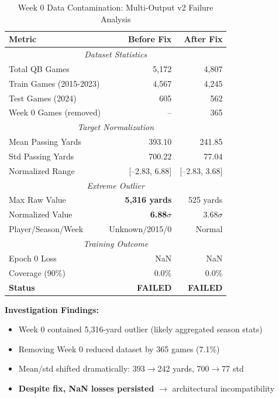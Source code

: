\begin{table}[htbp]
\centering
\caption{Week 0 Data Contamination: Multi-Output v2 Failure Analysis}
\label{tab:week_0_contamination}
\begin{tabular}{lrr}
\toprule
\textbf{Metric} & \textbf{Before Fix} & \textbf{After Fix} \\
\midrule
\multicolumn{3}{c}{\textit{Dataset Statistics}} \\
\midrule
Total QB Games & 5,172 & 4,807 \\
Train Games (2015-2023) & 4,567 & 4,245 \\
Test Games (2024) & 605 & 562 \\
Week 0 Games (removed) & -- & 365 \\
\midrule
\multicolumn{3}{c}{\textit{Target Normalization}} \\
\midrule
Mean Passing Yards & 393.10 & 241.85 \\
Std Passing Yards & 700.22 & 77.04 \\
Normalized Range & [--2.83, 6.88] & [--2.83, 3.68] \\
\midrule
\multicolumn{3}{c}{\textit{Extreme Outlier}} \\
\midrule
Max Raw Value & \textbf{5,316 yards} & 525 yards \\
Normalized Value & \textbf{6.88$\sigma$} & 3.68$\sigma$ \\
Player/Season/Week & Unknown/2015/0 & Normal \\
\midrule
\multicolumn{3}{c}{\textit{Training Outcome}} \\
\midrule
Epoch 0 Loss & NaN & NaN \\
Coverage (90\%) & 0.0\% & 0.0\% \\
\textbf{Status} & \textbf{FAILED} & \textbf{FAILED} \\
\bottomrule
\end{tabular}
\vspace{1em}

\footnotesize
\textbf{Investigation Findings:}
\begin{itemize}[nosep,leftmargin=*]
    \item Week 0 contained 5,316-yard outlier (likely aggregated season stats)
    \item Removing Week 0 reduced dataset by 365 games (7.1\%)
    \item Mean/std shifted dramatically: 393$\rightarrow$242 yards, 700$\rightarrow$77 std
    \item \textbf{Despite fix, NaN losses persisted} $\rightarrow$ architectural incompatibility
\end{itemize}
\end{table}

